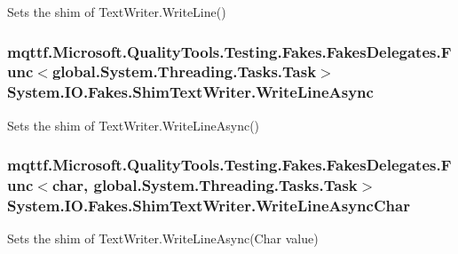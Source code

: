 Sets the shim of Text\-Writer.\-Write\-Line()

\hypertarget{class_system_1_1_i_o_1_1_fakes_1_1_shim_text_writer_a7a06c9601092618f87bf21f3b7df7397}{
\subsubsection[{Write\-Line\-Async}]{\setlength{\rightskip}{0pt plus 5cm}mqttf.\-Microsoft.\-Quality\-Tools.\-Testing.\-Fakes.\-Fakes\-Delegates.\-Func$<$global.\-System.\-Threading.\-Tasks.\-Task$>$ System.\-I\-O.\-Fakes.\-Shim\-Text\-Writer.\-Write\-Line\-Async\hspace{0.3cm}{\ttfamily [set]}}}\label{class_system_1_1_i_o_1_1_fakes_1_1_shim_text_writer_a7a06c9601092618f87bf21f3b7df7397}


Sets the shim of Text\-Writer.\-Write\-Line\-Async()

\hypertarget{class_system_1_1_i_o_1_1_fakes_1_1_shim_text_writer_a7eb66fa9a4f6fe64e5e2349c854231f6}{
\subsubsection[{Write\-Line\-Async\-Char}]{\setlength{\rightskip}{0pt plus 5cm}mqttf.\-Microsoft.\-Quality\-Tools.\-Testing.\-Fakes.\-Fakes\-Delegates.\-Func$<$char, global.\-System.\-Threading.\-Tasks.\-Task$>$ System.\-I\-O.\-Fakes.\-Shim\-Text\-Writer.\-Write\-Line\-Async\-Char\hspace{0.3cm}{\ttfamily [set]}}}\label{class_system_1_1_i_o_1_1_fakes_1_1_shim_text_writer_a7eb66fa9a4f6fe64e5e2349c854231f6}


Sets the shim of Text\-Writer.\-Write\-Line\-Async(\-Char value)

